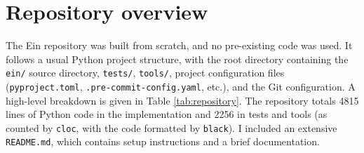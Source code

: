 \needspace{4em}
\section{Repository overview}
\label{repository-overview}

The Ein repository was built from scratch, and no pre-existing code was used.
It follows a usual Python project structure, with the root directory containing the \texttt{ein/} source directory, \texttt{tests/}, \texttt{tools/}, project configuration files (\texttt{pyproject.toml}, \texttt{.pre-commit-config.yaml}, etc.), and the Git configuration. 
A high-level breakdown is given in Table \ref{tab:repository}. The repository totals 4815 lines of Python code in the implementation and 2256 in tests and tools (as counted by \texttt{cloc}, with the code formatted by \texttt{black}). I included an extensive \texttt{README.md}, which contains setup instructions and a brief documentation.

